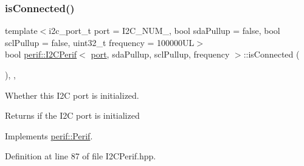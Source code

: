 \subsubsection{\texorpdfstring{isConnected()}{isConnected()}}
{\footnotesize\ttfamily template$<$i2c\+\_\+port\+\_\+t port = I2\+C\+\_\+\+N\+U\+M\+\_, bool sda\+Pullup = false, bool scl\+Pullup = false, uint32\+\_\+t frequency = 100000\+UL$>$ \\
bool \mbox{\hyperlink{classperif_1_1I2CPerif}{perif\+::\+I2\+C\+Perif}}$<$ \mbox{\hyperlink{classI2Cdev_a1d1e63732aa9f50369172b27a034129c}{port}}, sda\+Pullup, scl\+Pullup, frequency $>$\+::is\+Connected (\begin{DoxyParamCaption}{ }\end{DoxyParamCaption})\hspace{0.3cm}{\ttfamily [inline]}, {\ttfamily [override]}, {\ttfamily [virtual]}}

Whether this I2C port is initialized.

\begin{DoxyReturn}{Returns}
if the I2C port is initialized 
\end{DoxyReturn}


Implements \mbox{\hyperlink{classperif_1_1Perif_ab9a17fad04e595f3ac0c78b9d3be4c9e}{perif\+::\+Perif}}.



Definition at line 87 of file I2\+C\+Perif.\+hpp.


\begin{DoxyCode}{0}

\end{DoxyCode}
\mbox{\label{classI2Cdev_ab028a4f330f4f31dc8af9890431a2a63}} 
